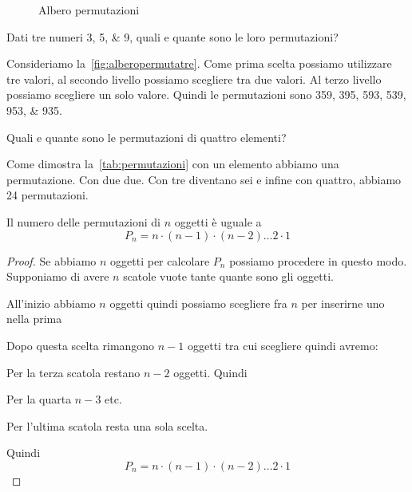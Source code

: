 \begin{figure}
	\centering
	
	\caption{Albero permutazioni}
	\label{fig:alberopermutatre}
\end{figure}
\begin{exmp}
Dati tre numeri \numlist{3;5;9}, quali e quante sono le loro permutazioni? 
\end{exmp}
Consideriamo la~\vref{fig:alberopermutatre}. Come prima scelta possiamo utilizzare tre valori, al secondo livello possiamo scegliere tra due valori. Al terzo livello possiamo scegliere un solo valore. Quindi le permutazioni sono \numlist{359;395;593;539;953;935}.
\begin{exmp}
	Quali e quante sono le permutazioni di quattro elementi?
\end{exmp}
Come dimostra la~\vref{tab:permutazioni} con un elemento abbiamo una permutazione. Con due due. Con tre diventano sei e infine con quattro, abbiamo 24 permutazioni.
\begin{thm}
	Il numero delle permutazioni di $n$ oggetti è uguale a
\[P_n=n\cdot (n-1)\cdot(n-2)\dots 2\cdot 1\]
\end{thm}
\begin{proof}
Se abbiamo $n$ oggetti per calcolare $P_n$ possiamo procedere in questo modo. Supponiamo di avere $n$ scatole vuote tante quante sono gli oggetti.\par 
\makebox[\linewidth]{\scatola{}\scatola{}\scatola{}\scatola{},\dots,\scatola{}}\par
 All'inizio abbiamo $n$ oggetti quindi possiamo scegliere fra $n$ per inserirne uno nella prima\par 
{}\par
 Dopo questa scelta rimangono $n-1$ oggetti tra cui scegliere quindi avremo:\par 
{}\par
 Per la terza scatola restano $n-2$ oggetti. Quindi\par 
{}\par
 Per la quarta $n-3$ etc.\par {}\par Per l'ultima scatola resta una sola scelta. \par {}\par Quindi \[P_n=n\cdot (n-1)\cdot(n-2)\dots 2\cdot 1\]
\end{proof}
